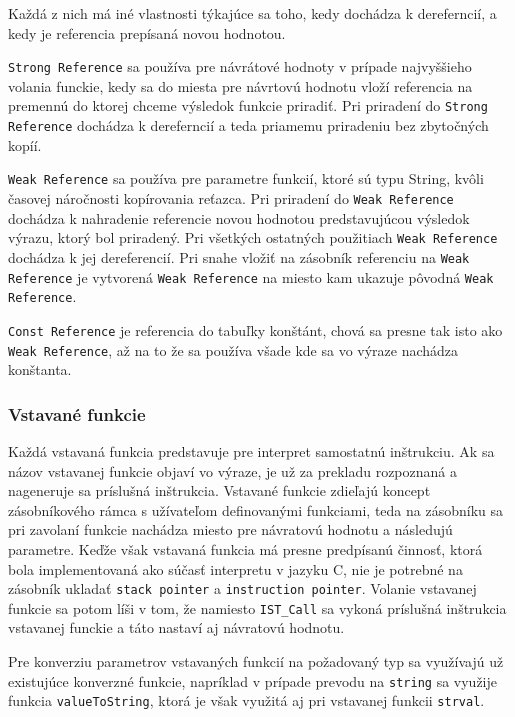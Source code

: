 \documentclass[12pt,a4paper,titlepage,final]{article}
\begin{document}
Každá z nich má iné vlastnosti týkajúce sa toho, kedy dochádza k dereferncií, a kedy
je referencia prepísaná novou hodnotou.

\texttt{Strong Reference} sa používa pre návrátové hodnoty v prípade najvyššieho volania funckie,
kedy sa do miesta pre návrtovú hodnotu vloží referencia na premennú do ktorej chceme
výsledok funkcie priradiť. Pri priradení do \texttt{Strong Reference} dochádza k dereferncií a teda
priamemu priradeniu bez zbytočných kopíí.

\texttt{Weak Reference} sa používa pre parametre funkcií, ktoré sú typu String, kvôli časovej náročnosti
kopírovania reťazca. Pri priradení do \texttt{Weak Reference} dochádza k nahradenie referencie
novou hodnotou predstavujúcou výsledok výrazu, ktorý bol priradený. Pri všetkých ostatných použitiach
\texttt{Weak Reference} dochádza k jej dereferencií. Pri snahe vložiť na zásobník referenciu na \texttt{Weak Reference}
je vytvorená \texttt{Weak Reference} na miesto kam ukazuje pôvodná \texttt{Weak Reference}.

\texttt{Const Reference} je referencia do tabuľky konštánt, chová sa presne tak isto ako \texttt{Weak Reference},
až na to že sa používa všade kde sa vo výraze nachádza konštanta.

\subsubsection{Vstavané funkcie}
Každá vstavaná funkcia predstavuje pre interpret samostatnú inštrukciu. Ak sa
názov vstavanej funkcie objaví vo výraze, je už za prekladu rozpoznaná a 
nageneruje sa príslušná inštrukcia. Vstavané funkcie zdieľajú koncept zásobníkového
rámca s užívateľom definovanými funkciami, teda na zásobníku sa pri zavolaní funkcie 
nachádza miesto pre návratovú hodnotu a následujú parametre. Keďže však vstavaná funkcia
má presne predpísanú činnosť, ktorá bola implementovaná ako súčasť interpretu v jazyku C,
nie je potrebné na zásobník ukladať \texttt{stack pointer} a \texttt{instruction pointer}.
Volanie vstavanej funkcie sa potom líši v tom, že namiesto \texttt{IST\_Call} sa vykoná 
príslušná inštrukcia vstavanej funckie a táto nastaví aj návratovú hodnotu.

Pre konverziu parametrov vstavaných funkcií na požadovaný typ sa využívajú už existujúce
konverzné funkcie, napríklad v prípade prevodu na \texttt{string} sa využije funkcia
\texttt{valueToString}, ktorá je však využitá aj pri vstavanej funkcii \texttt{strval}.
\end{document}
